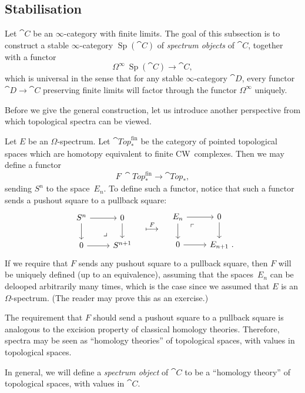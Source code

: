 \subsection{Stabilisation}

Let $\cat C$ be an $\infty$-category with finite limits.
The goal of this subsection is to construct
a stable $\infty$-category $\operatorname{Sp}(\cat{C})$ of \emph{spectrum objects} of $\cat C$,
together with a functor
\[\Omega^\infty\:\operatorname{Sp}(\cat{C})\to\cat{C},\]
which is universal in the sense that for any stable $\infty$-category $\cat D$,
every functor $\cat{D}\to\cat{C}$ preserving finite limits 
will factor through the functor $\Omega^\infty$ uniquely.

Before we give the general construction, 
let us introduce another perspective
from which topological spectra can be viewed.

Let $E$ be an $\Omega$-spectrum.
Let $\cat{Top}_*^{\mathrm{fin}}$ be the category 
of pointed topological spaces which are homotopy equivalent
to finite CW~complexes.
Then we may define a functor 
\[F\:\cat{Top}_*^{\mathrm{fin}}\to\cat{Top}_*,\]
sending $S^n$ to the space~$E_n$.
To define such a functor,
notice that such a functor sends a pushout square to a pullback square:
\[\begin{tikzcd}
    S^n\ar[r]\ar[d]\ar[dr,phantom,pos=.75,"\lrcorner"] & 0\ar[d] \\
    0\ar[r] & S^{n+1}
\end{tikzcd}
\quad\overset{F}{\longmapsto}\quad
\begin{tikzcd}
    E_n\ar[r]\ar[d]\ar[dr,phantom,pos=.25,"\ulcorner"] & 0\ar[d] \\
    0\ar[r] & E_{n+1}\rlap{\ .}
\end{tikzcd}\]
If we require that $F$ sends any pushout square to a pullback square,
then $F$ will be uniquely defined (up to an equivalence),
assuming that the spaces~$E_n$ can be delooped arbitrarily many times,
which is the case since we assumed that $E$ is an $\Omega$-spectrum.
(The reader may prove this as an exercise.)

The requirement that $F$ should send a pushout square to a pullback square
is analogous to the excision property of classical homology theories.
Therefore, spectra may be seen as ``homology theories'' of topological spaces,
with values in topological spaces.

In general, we will define a \emph{spectrum object} of $\cat{C}$
to be a ``homology theory'' of topological spaces,
with values in $\cat{C}$.

